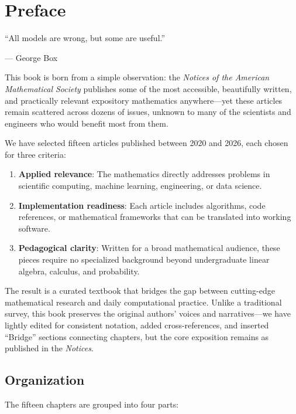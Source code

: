 \chapter*{Preface}

\epigraph{``All models are wrong, but some are useful.''}{--- George Box}

This book is born from a simple observation: the \textit{Notices of the American Mathematical Society} publishes some of the most accessible, beautifully written, and practically relevant expository mathematics anywhere---yet these articles remain scattered across dozens of issues, unknown to many of the scientists and engineers who would benefit most from them.

We have selected fifteen articles published between 2020 and 2026, each chosen for three criteria:
\begin{enumerate}
    \item \textbf{Applied relevance}: The mathematics directly addresses problems in scientific computing, machine learning, engineering, or data science.
    \item \textbf{Implementation readiness}: Each article includes algorithms, code references, or mathematical frameworks that can be translated into working software.
    \item \textbf{Pedagogical clarity}: Written for a broad mathematical audience, these pieces require no specialized background beyond undergraduate linear algebra, calculus, and probability.
\end{enumerate}

The result is a curated textbook that bridges the gap between cutting-edge mathematical research and daily computational practice. Unlike a traditional survey, this book preserves the original authors' voices and narratives---we have lightly edited for consistent notation, added cross-references, and inserted ``Bridge'' sections connecting chapters, but the core exposition remains as published in the \textit{Notices}.

\section*{Organization}

The fifteen chapters are grouped into four parts:

